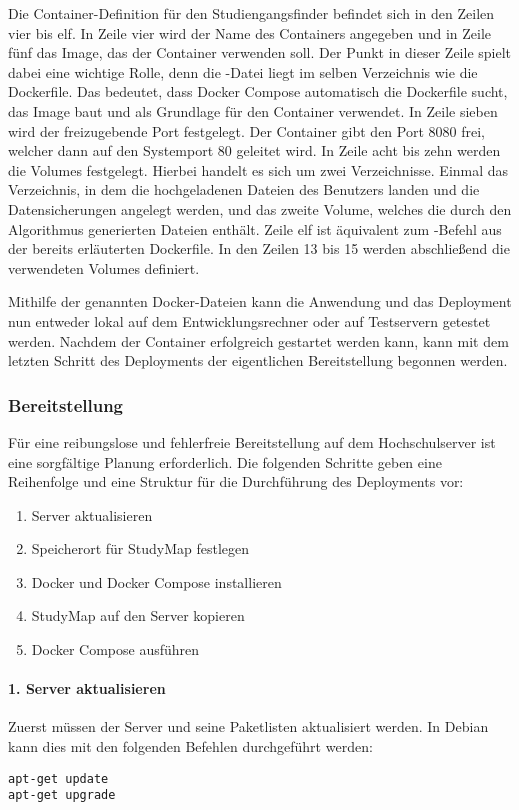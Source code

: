 Die Container-Definition für den Studiengangsfinder befindet sich in den Zeilen vier bis elf. In Zeile vier wird der Name des Containers angegeben und in Zeile fünf das Image, das der Container verwenden soll. Der Punkt in dieser Zeile spielt dabei eine wichtige Rolle, denn die -Datei liegt im selben Verzeichnis wie die Dockerfile. Das bedeutet, dass Docker Compose automatisch die Dockerfile sucht, das Image baut und als Grundlage für den Container verwendet. In Zeile sieben wird der freizugebende Port festgelegt. Der Container gibt den Port 8080 frei, welcher dann auf den Systemport 80 geleitet wird. In Zeile acht bis zehn werden die Volumes festgelegt. Hierbei handelt es sich um zwei Verzeichnisse. Einmal das Verzeichnis, in dem die hochgeladenen Dateien des Benutzers landen und die Datensicherungen angelegt werden, und das zweite Volume, welches die durch den Algorithmus generierten Dateien enthält. Zeile elf ist äquivalent zum -Befehl aus der bereits erläuterten Dockerfile. In den Zeilen 13 bis 15 werden abschließend die verwendeten Volumes definiert.

Mithilfe der genannten Docker-Dateien kann die Anwendung und das Deployment nun entweder lokal auf dem Entwicklungsrechner oder auf Testservern getestet werden. Nachdem der Container erfolgreich gestartet werden kann, kann mit dem letzten Schritt des Deployments der eigentlichen Bereitstellung begonnen werden.

\subsubsection{Bereitstellung}
Für eine reibungslose und fehlerfreie Bereitstellung auf dem Hochschulserver ist eine sorgfältige Planung erforderlich. Die folgenden Schritte geben eine Reihenfolge und eine Struktur für die Durchführung des Deployments vor:
\begin{enumerate}
    \item Server aktualisieren
    \item Speicherort für StudyMap festlegen
    \item Docker und Docker Compose installieren
    \item StudyMap auf den Server kopieren
    \item Docker Compose ausführen
\end{enumerate}

\paragraph*{1. Server aktualisieren}
Zuerst müssen der Server und seine Paketlisten aktualisiert werden. In Debian kann dies mit den folgenden Befehlen durchgeführt werden:
\begin{lstlisting}[style=Python]
apt-get update
apt-get upgrade
\end{lstlisting}

